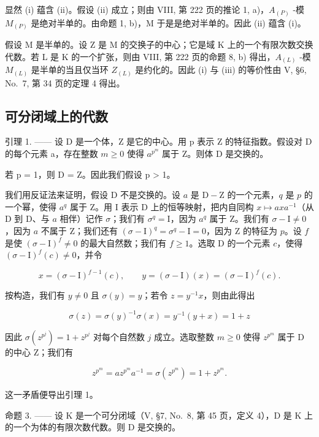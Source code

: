 显然 (i) 蕴含 (ii)。假设 (ii) 成立；则由 VIII, 第 222 页的推论 1, a)，\(A_{(P)}\) -模 \(M_{(P)}\) 是绝对半单的。由命题 1, b)，M 于是是绝对半单的。因此 (ii) 蕴含 (i)。

假设 M 是半单的。设 Z 是 M 的交换子的中心；它是域 K 上的一个有限次数交换代数。若 L 是 K 的一个扩张，则由 VIII, 第 222 页的命题 8, b) 得出，\(A_{(L)}\) -模 \(M_{(L)}\) 是半单的当且仅当环 \(Z_{(L)}\) 是约化的。因此 (i) 与 (iii) 的等价性由 V, §6, No.~7, 第 34 页的定理 4 得出。

\subsection{可分闭域上的代数}

引理 1. —— 设 D 是一个体，Z 是它的中心。用 p 表示 Z 的特征指数。假设对 D 的每个元素 a，存在整数 \(m \geqslant 0\) 使得 \(a^{p^{m}}\) 属于 Z。则体 D 是交换的。

若 p = 1，则 D = Z。因此我们假设 p \textgreater{} 1。

我们用反证法来证明，假设 D 不是交换的。设 \(a\) 是 \(\mathrm{D} - \mathrm{Z}\) 的一个元素，\(q\) 是 \(p\) 的一个幂，使得 \(a^q\) 属于 Z。用 I 表示 D 上的恒等映射，把内自同构 \(x \mapsto axa^{-1}\)（从 D 到 D、与 \(a\) 相伴）记作 \(\sigma\)；我们有 \(\sigma^q = \mathrm{I}\)，因为 \(a^q\) 属于 Z。我们有 \(\sigma - \mathrm{I} \neq 0\)，因为 \(a\) 不属于 Z；我们还有 \((\sigma - \mathrm{I})^q = \sigma^q - \mathrm{I} = 0\)，因为 Z 的特征为 \(p\)。设 \(f\) 是使 \((\sigma - \mathrm{I})^f \neq 0\) 的最大自然数；我们有 \(f \geqslant 1\)。选取 D 的一个元素 \(c\)，使得 \((\sigma - \mathrm{I})^f(c) \neq 0\)，并令

\[
x = (\sigma - \mathrm{I}) ^ {f - 1} (c), \qquad y = (\sigma - \mathrm{I}) (x) = (\sigma - \mathrm{I}) ^ {f} (c).
\]

按构造，我们有 \(y \neq 0\) 且 \(\sigma(y) = y\)；若令 \(z = y^{-1}x\)，则由此得出

\[
\sigma (z) = \sigma (y) ^ {- 1} \sigma (x) = y ^ {- 1} (y + x) = 1 + z
\]

因此 \(\sigma(z^{p^j}) = 1 + z^{p^j}\) 对每个自然数 \(j\) 成立。选取整数 \(m \geqslant 0\) 使得 \(z^{p^m}\) 属于 D 的中心 Z；我们有

\[
z ^ {p ^ {m}} = a z ^ {p ^ {m}} a ^ {- 1} = \sigma (z ^ {p ^ {m}}) = 1 + z ^ {p ^ {m}}.
\]

这一矛盾便导出引理 1。

命题 3. —— 设 K 是一个可分闭域（V, §7, No.~8, 第 45 页，定义 4），D 是 K 上的一个为体的有限次数代数。则 D 是交换的。

